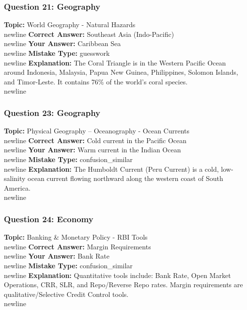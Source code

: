 \documentclass[a4paper,12pt]{article}
\begin{document}
\subsubsection{Question 21: Geography}
\textbf{Topic:} World Geography - Natural Hazards\\newline
\textbf{Correct Answer:} Southeast Asia (Indo-Pacific)\\newline
\textbf{Your Answer:} \textcolor{wrongred}{Caribbean Sea}\\newline
\textbf{Mistake Type:} guesswork\\newline
\textbf{Explanation:} The Coral Triangle is in the Western Pacific Ocean around Indonesia, Malaysia, Papua New Guinea, Philippines, Solomon Islands, and Timor-Leste. It contains 76\% of the world's coral species.\\newline
\vspace{0.5cm}
\subsubsection{Question 23: Geography}
\textbf{Topic:} Physical Geography – Oceanography - Ocean Currents\\newline
\textbf{Correct Answer:} Cold current in the Pacific Ocean\\newline
\textbf{Your Answer:} \textcolor{wrongred}{Warm current in the Indian Ocean}\\newline
\textbf{Mistake Type:} confusion\_similar\\newline
\textbf{Explanation:} The Humboldt Current (Peru Current) is a cold, low-salinity ocean current flowing northward along the western coast of South America.\\newline
\vspace{0.5cm}
\subsubsection{Question 24: Economy}
\textbf{Topic:} Banking \& Monetary Policy - RBI Tools\\newline
\textbf{Correct Answer:} Margin Requirements\\newline
\textbf{Your Answer:} \textcolor{wrongred}{Bank Rate}\\newline
\textbf{Mistake Type:} confusion\_similar\\newline
\textbf{Explanation:} Quantitative tools include: Bank Rate, Open Market Operations, CRR, SLR, and Repo/Reverse Repo rates. Margin requirements are qualitative/Selective Credit Control tools.\\newline
\vspace{0.5cm}
\end{document}
